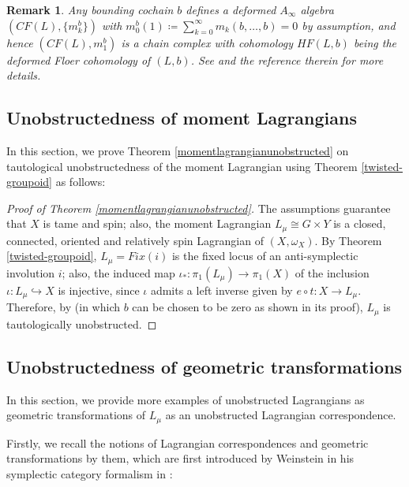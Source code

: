 \documentclass{amsart}
\newtheorem{remark}[theorem]{Remark}
\numberwithin{equation}{section}
\begin{document}
\begin{remark}\label{bdydeform}
    Any bounding cochain $b$ defines a deformed $A_\infty$ algebra $(CF(L), \{m_k^b\})$ with $m_0^b(1) \coloneqq \sum_{k=0}^{\infty} m_k(b, \ldots, b)  = 0$ by assumption, and hence $(CF(L), m_1^b)$ is a chain complex with cohomology $HF(L, b)$ being the deformed Floer cohomology of $(L, b)$. See \cite[Definition 6.3]{FOOOinvol} and the reference therein for more details.
\end{remark}

\subsection{Unobstructedness of moment Lagrangians}

In this section, we prove Theorem \ref{momentlagrangianunobstructed} on tautological unobstructedness of the moment Lagrangian using Theorem \ref{twisted-groupoid} as follows:

\begin{proof}[Proof of Theorem \ref{momentlagrangianunobstructed}]
    The assumptions guarantee that $X$ is tame and spin; also, the moment 
    Lagrangian $L_\mu \cong G \times Y$ is a closed, connected, oriented and relatively spin Lagrangian of $(X, \omega_X)$. By Theorem \ref{twisted-groupoid}, $L_\mu = Fix(i)$ is the fixed locus of an anti-symplectic involution $i$; also, the induced map $\iota_*: \pi_1(L_\mu)\rightarrow \pi_1(X)$ of the inclusion $\iota: L_\mu \hookrightarrow X$ is injective, since $\iota$ admits a left inverse given by 
    $e \circ t: X \rightarrow L_\mu$. Therefore, by \cite[Corollary 1.6]{FOOOinvol} (in which $b$ can be chosen to be zero as shown in its proof), $L_\mu$ is tautologically unobstructed.
\end{proof}




\subsection{Unobstructedness of geometric transformations}

In this section, we provide more examples of unobstructed Lagrangians as geometric transformations of $L_\mu$ as an unobstructed Lagrangian correspondence.

Firstly, we recall the notions of Lagrangian correspondences and geometric transformations by them, which are first introduced by Weinstein in his symplectic category formalism in \cite{sympcategory}:
\end{document}
